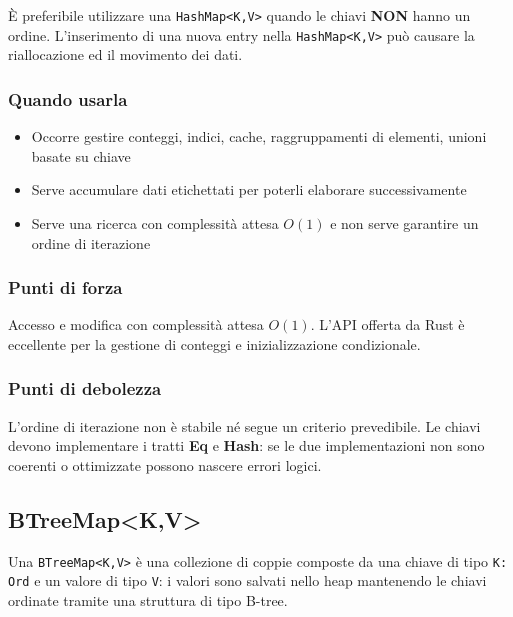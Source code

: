 È preferibile utilizzare una \texttt{HashMap<K,V>} quando le chiavi \textbf{NON} hanno
un ordine. L'inserimento di una nuova entry nella \texttt{HashMap<K,V>} può causare
la riallocazione ed il movimento dei dati.




\subsubsection{Quando usarla}

\begin{itemize}
  \item Occorre gestire conteggi, indici, cache, raggruppamenti di elementi,
        unioni basate su chiave
  \item Serve accumulare dati etichettati per poterli elaborare
        successivamente
  \item Serve una ricerca con complessità attesa $O(1)$ e non serve garantire
        un ordine di iterazione
\end{itemize}


\subsubsection{Punti di forza}

Accesso e modifica con complessità attesa $O(1)$. L'API offerta da Rust è
eccellente per la gestione di conteggi e inizializzazione condizionale.


\subsubsection{Punti di debolezza}
L'ordine di iterazione non è stabile né segue un criterio prevedibile.
Le chiavi devono implementare i tratti \textbf{Eq} e \textbf{Hash}: se le due implementazioni non sono coerenti o
ottimizzate possono nascere errori logici.


\subsection{BTreeMap<K,V>}

Una \texttt{BTreeMap<K,V>} è una collezione di coppie composte da una chiave di tipo
\texttt{K: Ord} e un valore di tipo \texttt{V}: i valori sono salvati nello
heap mantenendo le chiavi ordinate tramite una struttura di tipo B-tree.

